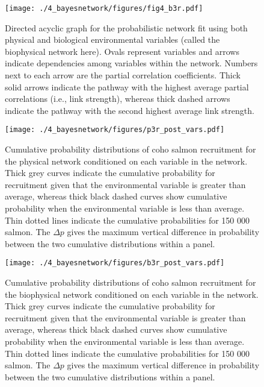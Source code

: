 \begin{figure}[htbp]
  \centering \texttt{[image: ./4\_bayesnetwork/figures/fig4\_b3r.pdf]}
  \caption[Directed acyclic graph for the probabilistic network fit using both
    physical and biological environmental variables.]{Directed acyclic graph for
    the probabilistic network fit using both physical and biological
    environmental variables (called the biophysical
    network here). Ovals represent variables and arrows indicate dependencies
    among variables within the network. Numbers next to each arrow are the
    partial correlation coefficients. Thick solid arrows indicate the pathway
    with the highest average partial correlations (i.e., link strength), whereas
    thick dashed arrows indicate the pathway with the second highest average
    link strength.}
  \label{fig:bn:5}
\end{figure}

\begin{figure}[htbp]
  \centering \texttt{[image: ./4\_bayesnetwork/figures/p3r\_post\_vars.pdf]}
  \caption[Cumulative probability distributions of coho salmon recruitment for
    the physical network conditioned on each variable in the
    network.]{Cumulative probability distributions of coho salmon recruitment for
    the physical network conditioned on each variable in the network. Thick grey
    curves indicate the cumulative probability for recruitment given that the
    environmental variable is greater than average, whereas thick black dashed
    curves show cumulative probability when the environmental variable is less
    than average. Thin dotted lines indicate the cumulative probabilities for
    150 000 salmon. The \(\Delta p\) gives the maximum vertical difference in
    probability between the two cumulative distributions within a panel.}
  \label{fig:bn:6}
\end{figure}

\begin{figure}[htbp]
  \centering \texttt{[image: ./4\_bayesnetwork/figures/b3r\_post\_vars.pdf]}
  \caption[Cumulative probability distributions of coho salmon recruitment for
    the biophysical network conditioned on each variable in the
    network.]{Cumulative probability distributions of coho salmon recruitment
    for the biophysical network conditioned on each variable in the network.
    Thick grey curves indicate the cumulative probability for recruitment given
    that the environmental variable is greater than average, whereas thick black
    dashed curves show cumulative probability when the environmental variable is
    less than average. Thin dotted lines indicate the cumulative probabilities
    for 150 000 salmon. The \(\Delta p\) gives the maximum vertical difference
    in probability between the two cumulative distributions within a panel.}
  \label{fig:bn:7}
\end{figure}

